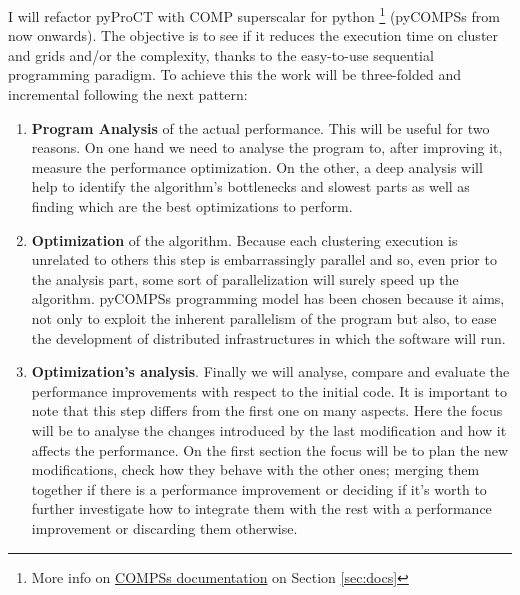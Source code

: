 I will refactor pyProCT with COMP superscalar for python \footnote{ More info on \hyperref[subsec:compss_doc]{COMPSs documentation} on Section \ref{sec:docs}} (pyCOMPSs from now onwards). The objective is to see if it reduces the execution time on cluster and grids and/or the complexity, thanks to  the easy-to-use sequential programming paradigm. To achieve this the work will be three-folded and incremental following the next pattern:
\begin{enumerate}
\item \textbf{Program Analysis} of the actual performance. This will be useful for two reasons. On one hand we need to analyse the program to, after improving it, measure the performance optimization. On the other, a deep analysis will help to identify the algorithm's bottlenecks and slowest parts as well as finding which are the best optimizations to perform.
\item \textbf{Optimization} of the algorithm. Because each clustering execution is unrelated to others this step is embarrassingly parallel and so, even prior to the analysis part, some sort of parallelization will surely speed up the algorithm. pyCOMPSs programming model has been chosen because it aims, not only to exploit the inherent parallelism of the program but also, to ease the development of distributed infrastructures in which the software will run. 
\item \textbf{Optimization's analysis}. Finally we will analyse, compare and evaluate the performance improvements with respect to the initial code. It is important to note that this step differs from the first one on many aspects. Here the focus will be to analyse the changes introduced by the last modification and how it affects the performance. On the first section the focus will be to plan the new modifications, check how they behave with the other ones; merging them together if there is a performance improvement or deciding if it's worth to further investigate how to integrate them with the rest with a performance improvement or discarding them otherwise.
\end{enumerate}

